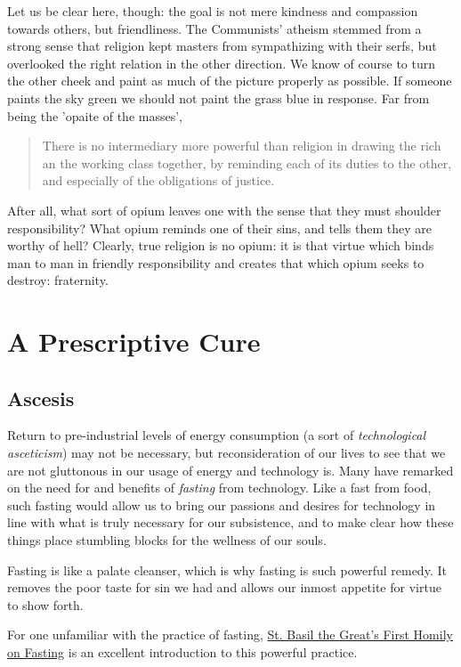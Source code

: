 \documentclass[letterpaper]{article}
\begin{document}
Let us be clear here, though: the goal is not mere kindness and compassion towards others, but friendliness. The Communists' atheism stemmed from a strong sense that religion kept masters from sympathizing with their serfs, but overlooked the right relation in the other direction. We know of course to turn the other cheek and paint as much of the picture properly as possible. If someone paints the sky green we should not paint the grass blue in response. Far from being the 'opaite of the masses',

\begin{quote}
  There is no intermediary more powerful than religion in drawing the rich an the working class together, by reminding each of its duties to the other, and especially of the obligations of justice.
\end{quote}

After all, what sort of opium leaves one with the sense that they must shoulder responsibility? What opium reminds one of their sins, and tells them they are worthy of hell? Clearly, true religion is no opium: it is that virtue which binds man to man in friendly responsibility and creates that which opium seeks to destroy: fraternity.

\section{A Prescriptive Cure}

\subsection{Ascesis}

Return to pre-industrial levels of energy consumption (a sort of \textit{technological asceticism}) may not be necessary, but reconsideration of our lives to see that we are not gluttonous in our usage of energy and technology is. Many have remarked on the need for and benefits of \textit{fasting} from technology. Like a fast from food, such fasting would allow us to bring our passions and desires for technology in line with what is truly necessary for our subsistence, and to make clear how these things place stumbling blocks for the wellness of our souls. 

Fasting is like a palate cleanser, which is why fasting is such powerful remedy. It removes the poor taste for sin we had and allows our inmost appetite for virtue to show forth.

For one unfamiliar with the practice of fasting, \href{http://rutgersnb.occministries.org/wp-content/uploads/2015/07/St.-Basil-the-Great%E2%80%99s-First-Homily-on-Fasting.pdf}{St. Basil the Great's First Homily on Fasting} is an excellent introduction to this powerful practice. 
\end{document}
